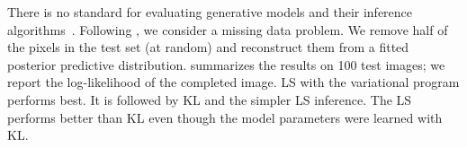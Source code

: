 There is no standard for evaluating generative models and their
inference algorithms~\citep{theis2016note}.
Following
\citet{Rezende:2014}, we consider a missing data problem. We remove
half of the pixels in the test set (at random) and reconstruct them
from a fitted posterior predictive distribution. 
summarizes the results on 100 test images; we report the
log-likelihood of the completed image. \gls{LS} with the variational
program performs best.  It is followed by \gls{KL} and the simpler
\gls{LS} inference. The \gls{LS} performs better than \gls{KL} even
though the model parameters were learned with \gls{KL}.
